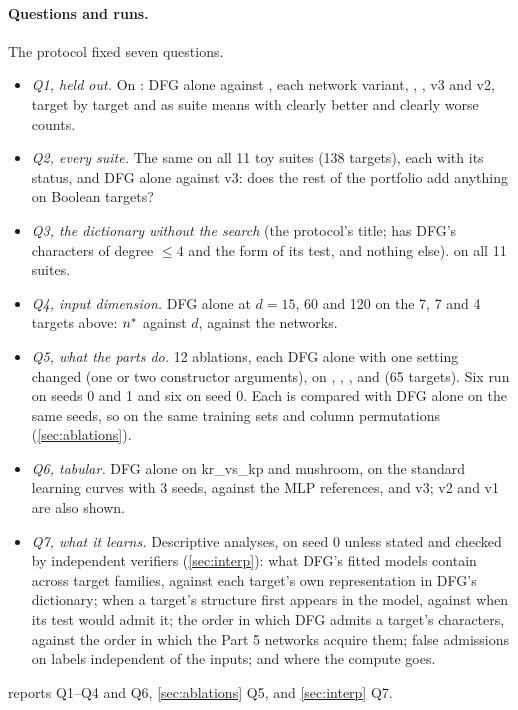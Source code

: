 \paragraph{Questions and runs.} The protocol fixed seven questions.
\begin{itemize}
\item \emph{Q1, held out.} On : DFG alone against , each network variant, , , v3 and v2, target by target and as suite means with clearly better and clearly worse counts.
\item \emph{Q2, every suite.} The same on all 11 toy suites (138 targets), each with its status, and DFG alone against v3: does the rest of the portfolio add anything on Boolean targets?
\item \emph{Q3, the dictionary without the search} (the protocol's title;  has DFG's characters of degree $\le4$ and the form of its test, and nothing else).  on all 11 suites.
\item \emph{Q4, input dimension.} DFG alone at $d=15$, 60 and 120 on the 7, 7 and 4 targets above: $n^{*}$ against $d$, against the networks.
\item \emph{Q5, what the parts do.} 12 ablations, each DFG alone with one setting changed (one or two constructor arguments), on , , ,  and  (65 targets). Six run on seeds 0 and 1 and six on seed 0. Each is compared with DFG alone on the same seeds, so on the same training sets and column permutations (\cref{sec:ablations}).
\item \emph{Q6, tabular.} DFG alone on kr\_vs\_kp and mushroom, on the standard learning curves with 3 seeds, against the MLP references,  and v3; v2 and v1 are also shown.
\item \emph{Q7, what it learns.} Descriptive analyses, on seed 0 unless stated and checked by independent verifiers (\cref{sec:interp}): what DFG's fitted models contain across target families, against each target's own representation in DFG's dictionary; when a target's structure first appears in the model, against when its test would admit it; the order in which DFG admits a target's characters, against the order in which the Part 5 networks acquire them; false admissions on labels independent of the inputs; and where the compute goes.
\end{itemize}
 reports Q1--Q4 and Q6, \cref{sec:ablations} Q5, and \cref{sec:interp} Q7.

